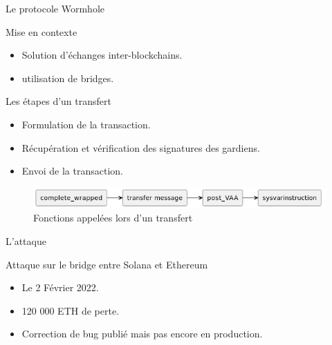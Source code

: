 \begin{frame}{Le protocole Wormhole}
    \begin{block}{Mise en contexte}
        \begin{itemize}
            \item Solution d'échanges inter-blockchains.
            \item utilisation de bridges.
        \end{itemize}
    \end{block}
    \begin{block}{Les étapes d'un transfert}
        \begin{itemize}
            \item Formulation de la transaction.
            \item Récupération et vérification des signatures des gardiens.
            \item Envoi de la transaction.
        \end{itemize}
    \end{block}
    \begin{figure}
        \centering
        \includegraphics[scale = 0.3]{centralisation/img/fonctions.png}
        \caption{Fonctions appelées lors d'un transfert}
    \end{figure}
\end{frame}

\begin{frame}{L'attaque}
    \begin{block}{Attaque sur le bridge entre Solana et Ethereum}
        \begin{itemize}
            \item Le 2 Février 2022.
            \item 120 000 ETH de perte.
            \item Correction de bug publié mais pas encore en production.
        \end{itemize}
    \end{block}
\end{frame}

